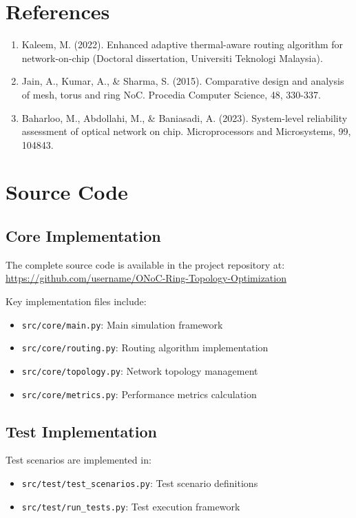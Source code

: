 \documentclass[12pt]{article}
\begin{document}
\clearpage
{}
\section*{References}
\begin{enumerate}
    \item Kaleem, M. (2022). Enhanced adaptive thermal-aware routing algorithm for network-on-chip (Doctoral dissertation, Universiti Teknologi Malaysia).
    \item Jain, A., Kumar, A., \& Sharma, S. (2015). Comparative design and analysis of mesh, torus and ring NoC. Procedia Computer Science, 48, 330-337.
    \item Baharloo, M., Abdollahi, M., \& Baniasadi, A. (2023). System-level reliability assessment of optical network on chip. Microprocessors and Microsystems, 99, 104843.
\end{enumerate}

\clearpage
\appendix
\section{Source Code}
\subsection{Core Implementation}
The complete source code is available in the project repository at:
\url{https://github.com/username/ONoC-Ring-Topology-Optimization}

Key implementation files include:
\begin{itemize}[noitemsep]
    \item \texttt{src/core/main.py}: Main simulation framework
    \item \texttt{src/core/routing.py}: Routing algorithm implementation
    \item \texttt{src/core/topology.py}: Network topology management
    \item \texttt{src/core/metrics.py}: Performance metrics calculation
\end{itemize}

\subsection{Test Implementation}
Test scenarios are implemented in:
\begin{itemize}[noitemsep]
    \item \texttt{src/test/test\_scenarios.py}: Test scenario definitions
    \item \texttt{src/test/run\_tests.py}: Test execution framework
\end{itemize}
\end{document}
